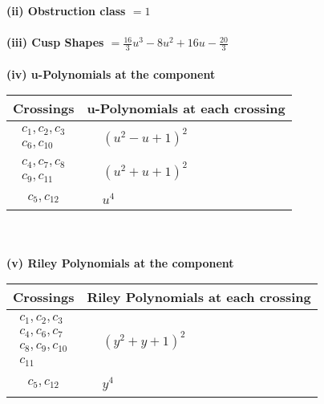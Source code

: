 \documentclass[1p]{elsarticle_modified}
\theoremstyle{definition}
\begin{document}
\flushleft \textbf{(ii) Obstruction class $= 1$}\\~\\
\flushleft \textbf{(iii) Cusp Shapes $= \frac{16}{3} u^3-8 u^2+16 u-\frac{20}{3}$}\\~\\
\newpage\renewcommand{\arraystretch}{1}
\flushleft \textbf{(iv) u-Polynomials at the component}\newline \\
\begin{tabular}{m{50pt}|m{274pt}}
Crossings & \hspace{64pt}u-Polynomials at each crossing \\
\hline $$\begin{aligned}c_{1},c_{2},c_{3}\\c_{6},c_{10}\end{aligned}$$&$\begin{aligned}
&(u^2- u+1)^2
\end{aligned}$\\
\hline $$\begin{aligned}c_{4},c_{7},c_{8}\\c_{9},c_{11}\end{aligned}$$&$\begin{aligned}
&(u^2+u+1)^2
\end{aligned}$\\
\hline $$\begin{aligned}c_{5},c_{12}\end{aligned}$$&$\begin{aligned}
&u^4
\end{aligned}$\\
\hline
\end{tabular}\\~\\
\newpage\renewcommand{\arraystretch}{1}
\flushleft \textbf{(v) Riley Polynomials at the component}\newline \\
\begin{tabular}{m{50pt}|m{274pt}}
Crossings & \hspace{64pt}Riley Polynomials at each crossing \\
\hline $$\begin{aligned}c_{1},c_{2},c_{3}\\c_{4},c_{6},c_{7}\\c_{8},c_{9},c_{10}\\c_{11}\end{aligned}$$&$\begin{aligned}
&(y^2+y+1)^2
\end{aligned}$\\
\hline $$\begin{aligned}c_{5},c_{12}\end{aligned}$$&$\begin{aligned}
&y^4
\end{aligned}$\\
\hline
\end{tabular}\\~\\
\end{document}
